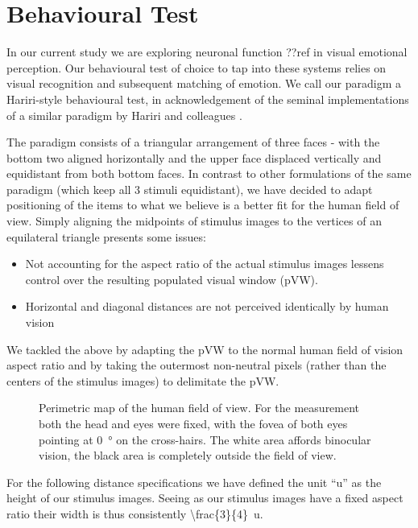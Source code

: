    \section{Behavioural Test}
    In our current study we are exploring neuronal function ??ref in visual emotional perception.
    Our behavioural test of choice to tap into these systems relies on visual recognition and subsequent matching of emotion.
    We call our paradigm a Hariri-style behavioural test, in acknowledgement of the seminal implementations of a similar paradigm by Hariri and colleagues \cite{Hariri2000,Hariri2003}.
        
    The paradigm consists of a triangular arrangement of three faces - with the bottom two aligned horizontally and the upper face displaced vertically and equidistant from both bottom faces.
    In contrast to other formulations\cite{Hariri2000,Hariri2003} of the same paradigm (which keep all 3 stimuli equidistant),
    we have decided to adapt positioning of the items to what we believe is a better fit for the human field of view.
    Simply aligning the midpoints of stimulus images to the vertices of an equilateral triangle presents some issues:
    \begin{itemize}
        \item Not accounting for the aspect ratio of the actual stimulus images lessens control over the resulting populated visual window (pVW).
	\item Horizontal and diagonal distances are not perceived identically by human vision 
    \end{itemize}
    We tackled the above by adapting the pVW to the normal human field of vision aspect ratio and by taking the outermost non-neutral pixels (rather than the centers of the stimulus images) to delimitate the pVW.
    
    \begin{wrapfigure}{r}{0.45\textwidth}
      \centering
	\caption{Perimetric map of the human field of view. \cite{Ruch1960} 
	For the measurement both the head and eyes were fixed, with the fovea of both eyes pointing at \SI{0}{\degree} on the cross-hairs.
	The white area affords binocular vision, the black area is completely outside the field of view.}
	\label{fig:m_b_1}
    \end{wrapfigure}    
    For the following distance specifications we have defined the unit “u” as the height of our stimulus images.
    Seeing as our stimulus images have a fixed aspect ratio their width is thus consistently \SI[parse-numbers = false]{\frac{3}{4}}{u}.
    
